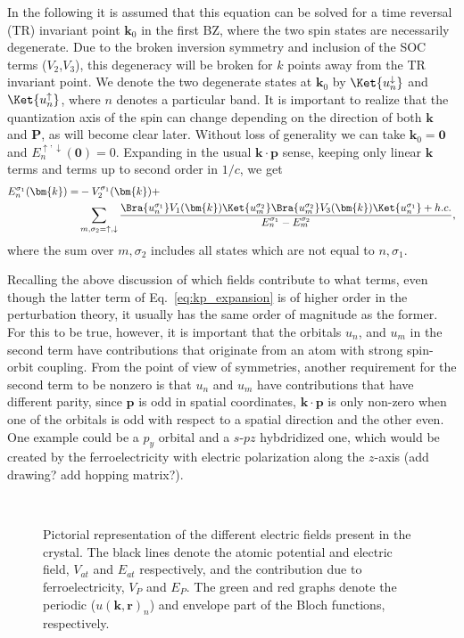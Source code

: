 In the following it is assumed that this equation can be solved for a time reversal (TR) invariant point $\bm{k}_0$ in the first BZ, where the two spin states are necessarily degenerate. Due to the broken inversion symmetry and inclusion of the SOC terms ($V_2$,$V_3$), this degeneracy will be broken for $k$ points away from the TR invariant point.
We denote the two degenerate states at $\bm{k}_0$ by $\Ket{u_n^\downarrow}$ and $\Ket{u_n^\uparrow}$, where $n$ denotes a particular band. It is important to realize that the quantization axis of the spin can change depending on the direction of both $\bm{k}$ and $\bm{P}$, as will become clear later.
Without loss of generality we can take $\bm{k}_0 = \bm{0}$ and $E^{\uparrow,\downarrow}_n(\bm{0}) = 0$.
Expanding in the usual $\bm{k}\cdot\bm{p}$ sense, keeping only linear $\bm{k}$ terms and terms up to second order in $1/c$, we get
\begin{align}
	\label{eq:kp_expansion}
	E_n^{\sigma_1}(\bm{k}) =& - V_2^{\sigma_1}(\bm{k}) + \\
		& \sum_{m,\sigma_2=\uparrow,\downarrow}\frac{\Bra{u_n^{\sigma_1}} V_1(\bm{k}) \Ket{u_m^{\sigma_2}}\Bra{u_m^{\sigma_2}} V_3(\bm{k}) \Ket{u_n^{\sigma_1}} + h.c.}{E_n^{\sigma_1} - E_m^{\sigma_2}},
\end{align}
where the sum over $m, \sigma_2$ includes all states which are not equal to $n, \sigma_1$. 

Recalling the above discussion of which fields contribute to what terms, even though the latter term of Eq.~\ref{eq:kp_expansion} is of higher order in the perturbation theory, it usually has the same order of magnitude as the former. 
For this to be true, however, it is important that the orbitals $u_n$, and $u_m$ in the second term have contributions that originate from an atom with strong spin-orbit coupling. From the point of view of symmetries, another requirement for the second term to be nonzero is that $u_n$ and $u_m$ have contributions that have different parity, since $\bm{p}$ is odd in spatial coordinates, $\bm{k} \cdot \bm{p}$ is only non-zero when one of the orbitals is odd with respect to a spatial direction and the other even. One example could be a $p_y$ orbital and a $s$-$pz$ hybdridized one, which would be created by the ferroelectricity with electric polarization along the $z$-axis (add drawing? add hopping matrix?).

\begin{figure}[h]
~\centering
{}\caption{\label{fig:Efield_cell_drawing} Pictorial representation of the different electric fields present in the crystal. The black lines denote the atomic potential and electric field, $V_{at}$ and $E_{at}$ respectively, and the contribution due to ferroelectricity, $V_P$ and $E_P$. The green and red graphs denote the periodic ($u(\bm{k}, \bm{r})_n$) and envelope part of the Bloch functions, respectively.}
\end{figure}

